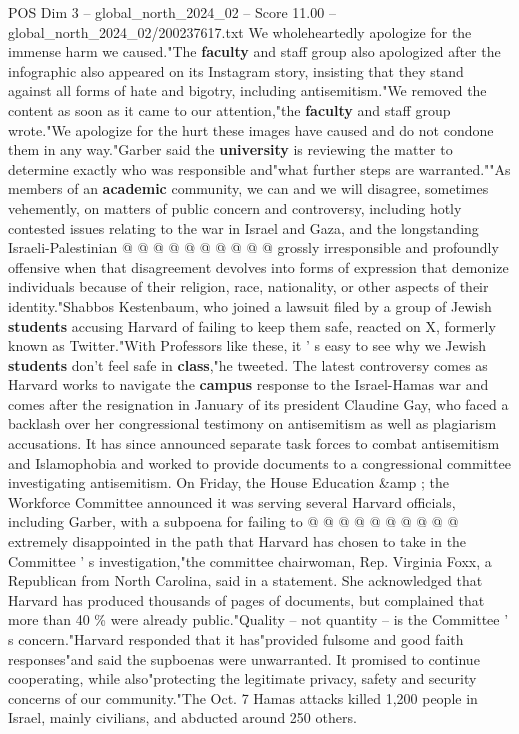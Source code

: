 \begin{textsample}{POS Dim 3 – global\_north\_2024\_02 – Score 11.00 – global\_north\_2024\_02/200237617.txt}
We wholeheartedly apologize for the immense harm we caused."The \textbf{faculty} and staff group also apologized after the infographic also appeared on its Instagram story, insisting that they stand against all forms of hate and bigotry, including antisemitism."We removed the content as soon as it came to our attention,"the \textbf{faculty} and staff group wrote."We apologize for the hurt these images have caused and do not condone them in any way."Garber said the \textbf{university} is reviewing the matter to determine exactly who was responsible and"what further steps are warranted.""As members of an \textbf{academic} community, we can and we will disagree, sometimes vehemently, on matters of public concern and controversy, including hotly contested issues relating to the war in Israel and Gaza, and the longstanding Israeli-Palestinian @ @ @ @ @ @ @ @ @ @ grossly irresponsible and profoundly offensive when that disagreement devolves into forms of expression that demonize individuals because of their religion, race, nationality, or other aspects of their identity."Shabbos Kestenbaum, who joined a lawsuit filed by a group of Jewish \textbf{students} accusing Harvard of failing to keep them safe, reacted on X, formerly known as Twitter."With Professors like these, it ' s easy to see why we Jewish \textbf{students} don't feel safe in \textbf{class},"he tweeted.
The latest controversy comes as Harvard works to navigate the \textbf{campus} response to the Israel-Hamas war and comes after the resignation in January of its president Claudine Gay, who faced a backlash over her congressional testimony on antisemitism as well as plagiarism accusations.
It has since announced separate task forces to combat antisemitism and Islamophobia and worked to provide documents to a congressional committee investigating antisemitism.
On Friday, the House Education \&amp ; the Workforce Committee announced it was serving several Harvard officials, including Garber, with a subpoena for failing to @ @ @ @ @ @ @ @ @ @ extremely disappointed in the path that Harvard has chosen to take in the Committee ' s investigation,"the committee chairwoman, Rep.
Virginia Foxx, a Republican from North Carolina, said in a statement.
She acknowledged that Harvard has produced thousands of pages of documents, but complained that more than 40 \% were already public."Quality -- not quantity -- is the Committee ' s concern."Harvard responded that it has"provided fulsome and good faith responses"and said the supboenas were unwarranted.
It promised to continue cooperating, while also"protecting the legitimate privacy, safety and security concerns of our community."The Oct. 7 Hamas attacks killed 1,200 people in Israel, mainly civilians, and abducted around 250 others.

\end{textsample}
